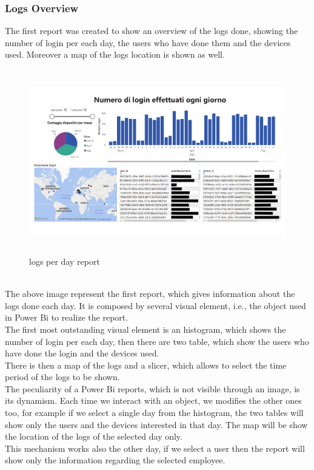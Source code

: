 \documentclass[12pt, a4paper, oneside]{article}
\begin{document}
\subsubsection{Logs Overview}
The first report was created to show an overview of the logs done, showing the number of login per each day, the users who have done them and the devices used. Moreover a map of the logs location is shown as
well.
\begin{figure}[h]
    \centering
    \includegraphics[width=\textwidth, height=8cm]{log-per-day.png}
    \caption{logs per day report}
\end{figure}\\
The above image represent the first report, which gives information about the logs done each day. It is composed by several visual element, i.e., the object used in Power Bi to realize the report.\\
The first most outstanding visual element is an histogram, which shows the number of login per each day, then there are two table, which show the users who have done the login and the devices used.\\
There is then a map of the logs and a slicer, which allows to select the time period of the logs to be shown.\\
The peculiarity of a Power Bi reports, which is not visible through an image, is its dynamism. Each time we interact with an object, we modifies the other ones too, for example if we select a single day from the
histogram, the two tables will show only the users and the devices interested in that day. The map will be show the location of the logs of the selected day only.\\
This mechanism works also the other day, if we select a user then the report will show only the information regarding the selected employee.\\
\end{document}
